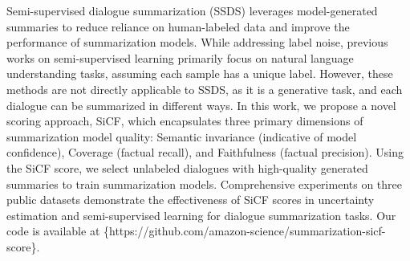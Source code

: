 Semi-supervised dialogue summarization (SSDS) leverages model-generated summaries to reduce reliance on human-labeled data and improve the performance of summarization models. While addressing label noise, previous works on semi-supervised learning primarily focus on natural language understanding tasks, assuming each sample has a unique label. However, these methods are not directly applicable to SSDS, as it is a generative task, and each dialogue can be summarized in different ways. In this work, we propose a novel scoring approach, SiCF, which encapsulates three primary dimensions of summarization model quality: Semantic invariance (indicative of model confidence), Coverage (factual recall), and Faithfulness (factual precision). Using the SiCF score, we select unlabeled dialogues with high-quality generated summaries to train summarization models. Comprehensive experiments on three public datasets demonstrate the effectiveness of SiCF scores in uncertainty estimation and semi-supervised learning for dialogue summarization tasks. Our code is available at \{https://github.com/amazon-science/summarization-sicf-score\}.